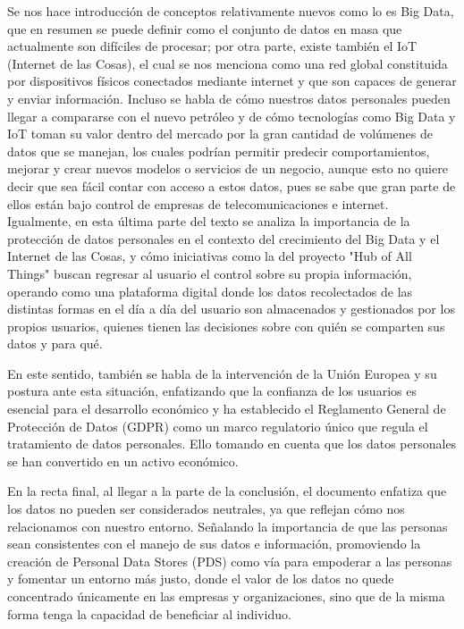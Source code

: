 \documentclass[12pt]{report}
\begin{document}
\begin{enumerate}[label=\textbf{\arabic*.}, leftmargin=*]
\begin{enumerate}[label=\textbf{\alph*.}, leftmargin=*, itemsep=1.0em]
Se nos hace introducción de conceptos relativamente nuevos como lo es Big Data, que en resumen se puede definir como el conjunto de datos en masa que actualmente son difíciles de procesar; por otra parte, existe también el IoT (Internet de las Cosas), el cual se nos menciona como una red global constituida por dispositivos físicos conectados mediante internet y que son capaces de generar y enviar información. Incluso se habla de cómo nuestros datos personales pueden llegar a compararse con el nuevo petróleo y de cómo tecnologías como Big Data y IoT toman su valor dentro del mercado por la gran cantidad de volúmenes de datos que se manejan, los cuales podrían permitir predecir comportamientos, mejorar y crear nuevos modelos o servicios de un negocio, aunque esto no quiere decir que sea fácil contar con acceso a estos datos, pues se sabe que gran parte de ellos están bajo control de empresas de telecomunicaciones e internet.\\

Igualmente, en esta última parte del texto se analiza la importancia de la protección de datos personales en el contexto del crecimiento del Big Data y el Internet de las Cosas, y cómo iniciativas como la del proyecto "Hub of All Things" buscan regresar al usuario el control sobre su propia información, operando como una plataforma digital donde los datos recolectados de las distintas formas en el día a día del usuario son almacenados y gestionados por los propios usuarios, quienes tienen las decisiones sobre con quién se comparten sus datos y para qué.

En este sentido, también se habla de la intervención de la Unión Europea y su postura ante esta situación, enfatizando que la confianza de los usuarios es esencial para el desarrollo económico y ha establecido el Reglamento General de Protección de Datos (GDPR) como un marco regulatorio único que regula el tratamiento de datos personales. Ello tomando en cuenta que los datos personales se han convertido en un activo económico.

En la recta final, al llegar a la parte de la conclusión, el documento enfatiza que los datos no pueden ser considerados neutrales, ya que reflejan cómo nos relacionamos con nuestro entorno. Señalando la importancia de que las personas sean consistentes con el manejo de sus datos e información, promoviendo la creación de Personal Data Stores (PDS) como vía para empoderar a las personas y fomentar un entorno más justo, donde el valor de los datos no quede concentrado únicamente en las empresas y organizaciones, sino que de la misma forma tenga la capacidad de beneficiar al individuo.







\end{enumerate}
\end{enumerate}
\end{document}
